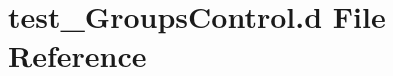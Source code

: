 \hypertarget{test___groups_control_8d}{}\section{test\+\_\+\+Groups\+Control.\+d File Reference}
\label{test___groups_control_8d}
